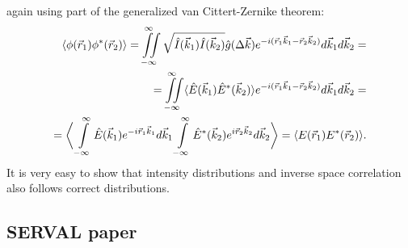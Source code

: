         again using part of the generalized van Cittert-Zernike theorem:
        \begin{align}
            \langle \phi(\vec{r}_1) \phi^*(\vec{r}_2) \rangle =  
            \iint \limits_{-\infty}^{\infty}  \sqrt{\hat{I}(\vec{k}_1)\hat{I}(\vec{k}_2)}\hat{g}(\Delta \vec{k}) e^{-i (\vec{r}_1\vec{k}_1 - \vec{r}_2\vec{k}_2)} d\vec{k}_1 d\vec{k}_2 = \cr 
            = \iint \limits_{-\infty}^{\infty} \langle \hat{E}(\vec{k}_1) \hat{E}^{*}(\vec{k}_2) \rangle  e^{-i (\vec{r}_1\vec{k}_1 - \vec{r}_2\vec{k}_2)} d\vec{k}_1 d\vec{k}_2 = \cr
            = \bigg\langle \int \limits_{-\infty}^{\infty} \hat{E}(\vec{k}_1) e^{-i \vec{r}_1\vec{k}_1} d\vec{k}_1 \int \limits_{-\infty}^{\infty} \hat{E}^{*}(\vec{k}_2) e^{i \vec{r}_2\vec{k}_2} d\vec{k}_2 \bigg\rangle = \langle E(\vec{r}_1)E^{*}(\vec{r}_2) \rangle.
        \end{align}
        It is very easy to show that intensity distributions and inverse space correlation also follows correct distributions.
        
    \subsection{SERVAL paper}
    

    